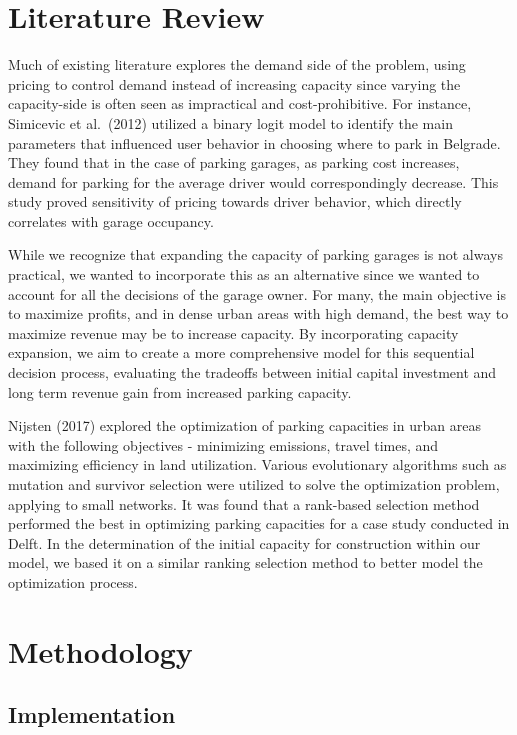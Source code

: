 \documentclass[
  letterpaper,
  DIV=11,
  numbers=noendperiod]{scrartcl}
\begin{document}
\section{Literature Review}\label{literature-review}

Much of existing literature explores the demand side of the problem,
using pricing to control demand instead of increasing capacity since
varying the capacity-side is often seen as impractical and
cost-prohibitive. For instance, Simicevic et al.~(2012) utilized a
binary logit model to identify the main parameters that influenced user
behavior in choosing where to park in Belgrade. They found that in the
case of parking garages, as parking cost increases, demand for parking
for the average driver would correspondingly decrease. This study proved
sensitivity of pricing towards driver behavior, which directly
correlates with garage occupancy.

While we recognize that expanding the capacity of parking garages is not
always practical, we wanted to incorporate this as an alternative since
we wanted to account for all the decisions of the garage owner. For
many, the main objective is to maximize profits, and in dense urban
areas with high demand, the best way to maximize revenue may be to
increase capacity. By incorporating capacity expansion, we aim to create
a more comprehensive model for this sequential decision process,
evaluating the tradeoffs between initial capital investment and long
term revenue gain from increased parking capacity.

Nijsten (2017) explored the optimization of parking capacities in urban
areas with the following objectives - minimizing emissions, travel
times, and maximizing efficiency in land utilization. Various
evolutionary algorithms such as mutation and survivor selection were
utilized to solve the optimization problem, applying to small networks.
It was found that a rank-based selection method performed the best in
optimizing parking capacities for a case study conducted in Delft. In
the determination of the initial capacity for construction within our
model, we based it on a similar ranking selection method to better model
the optimization process.

\section{Methodology}\label{methodology}

\subsection{Implementation}\label{implementation}
\end{document}
